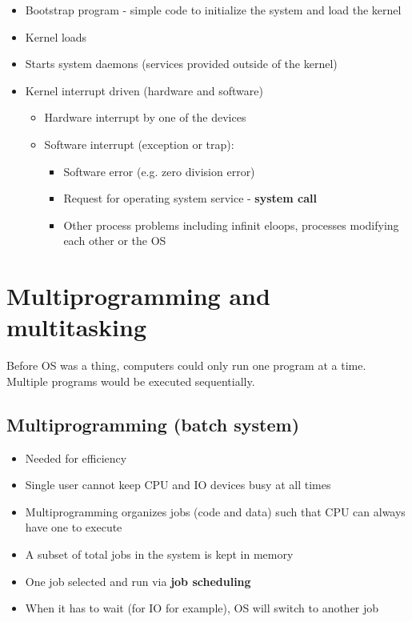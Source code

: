 \documentclass[12pt]{book}
\begin{document}
\begin{itemize}
    \item Bootstrap program - simple code to initialize the system and load the kernel
    \item Kernel loads
    \item Starts system daemons (services provided outside of the kernel)
    \item Kernel interrupt driven (hardware and software)
    
    \begin{itemize}
        \item Hardware interrupt by one of the devices
        \item Software interrupt (exception or trap):
        \begin{itemize}
            \item Software error (e.g. zero division error)
            \item Request for operating system service - \textbf{system call}
            \item Other process problems including infinit eloops, processes modifying each other or the OS
        \end{itemize} 
    \end{itemize}
\end{itemize}

\section*{Multiprogramming and multitasking}
Before OS was a thing, computers could only run one program at a time. Multiple programs would be executed sequentially.

\subsection*{Multiprogramming (batch system)}

\begin{itemize}
    \item Needed for efficiency
    \item Single user cannot keep CPU and IO devices busy at all times
    \item Multiprogramming organizes jobs (code and data) such that CPU can always have one to execute
    \item A subset of total jobs in the system is kept in memory
    \item One job selected and run via \textbf{job scheduling}
    \item When it has to wait (for IO for example), OS will switch to another job
\end{itemize}
\end{document}
